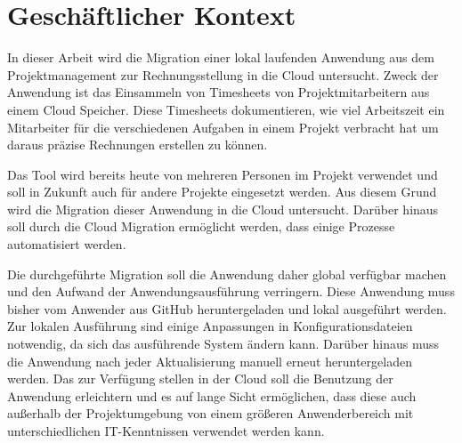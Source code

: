 \section{Geschäftlicher Kontext}

In dieser Arbeit wird die Migration einer lokal laufenden Anwendung aus dem Projektmanagement zur Rechnungsstellung in die Cloud untersucht. Zweck der Anwendung ist das Einsammeln von Timesheets von Projektmitarbeitern aus einem Cloud Speicher. Diese Timesheets dokumentieren, wie viel Arbeitszeit ein Mitarbeiter für die verschiedenen Aufgaben in einem Projekt verbracht hat um daraus präzise Rechnungen erstellen zu können.

Das Tool wird bereits heute von mehreren Personen im Projekt verwendet und soll in Zukunft auch für andere Projekte eingesetzt werden. Aus diesem Grund wird die Migration dieser Anwendung in die Cloud untersucht.
Darüber hinaus soll durch die Cloud Migration ermöglicht werden, dass einige Prozesse automatisiert werden.


Die durchgeführte Migration soll die Anwendung daher global verfügbar machen und den Aufwand der Anwendungsausführung verringern. Diese Anwendung muss bisher vom Anwender aus GitHub heruntergeladen und lokal ausgeführt werden. Zur lokalen Ausführung sind einige Anpassungen in Konfigurationsdateien notwendig, da sich das ausführende System ändern kann. Darüber hinaus muss die Anwendung nach jeder Aktualisierung manuell erneut heruntergeladen werden. Das zur Verfügung stellen in der Cloud soll die Benutzung der Anwendung erleichtern und es auf lange Sicht ermöglichen, dass diese auch außerhalb der Projektumgebung von einem größeren Anwenderbereich mit unterschiedlichen IT-Kenntnissen verwendet werden kann.